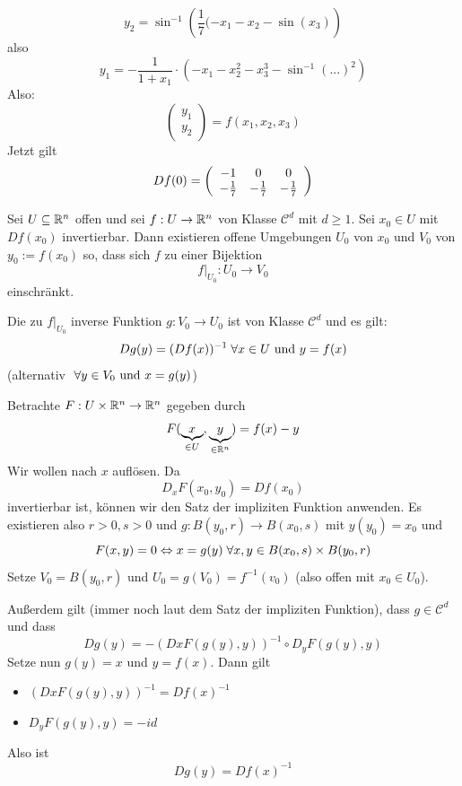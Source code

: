 \documentclass[main.tex]{subfiles}
\begin{document}
\begin{Beispiel}
  $$y_2 = \sin^{-1}\left(\dfrac{1}{7} (-x_1 - x_2 - \sin(x_3)\right)$$
  also
  $$y_1 = - \dfrac{1}{1 + x_1} \cdot (-x_1 - x_2^2 - x_3^3 - \sin^{-1}(...)^2)$$
  Also:
  $$\left(\begin{array}{c}
    y_1 \\ y_2
  \end{array}\right) = f(x_1,x_2,x_3)$$
  Jetzt gilt
  $$Df(0) = \left(\begin{array}{c c c}
    -1 & 0 & 0 \\
    -\frac{1}{7} & -\frac{1}{7} & -\frac{1}{7}
  \end{array}\right)$$
\end{Beispiel}

\begin{Theorem}
  Sei $U \subseteq \mathbb{R}^n$ offen und sei $f: U \to \mathbb{R}^n$ von Klasse $\mathcal{C}^d$ mit $d \geq 1$. Sei $x_0 \in U$ mit $Df(x_0)$ invertierbar. Dann existieren offene Umgebungen $U_0$ von $x_0$ und $V_0$ von $y_0 := f(x_0)$ so, dass sich $f$ zu einer Bijektion
  $$f |_{U_0} : U_0 \to V_0$$
  einschränkt.

  Die zu $f |_{U_0}$ inverse Funktion $g: V_0 \to U_0$ ist von Klasse $\mathcal{C}^d$ und es gilt:
  $$Dg(y) = (Df(x))^{-1} \;\forall x \in U \text{ und } y = f(x)$$
  (alternativ $\;\forall y \in V_0 \text{ und } x =g(y)$)
\end{Theorem}

\begin{Beweis}
  Betrachte $F: U \times \mathbb{R}^n \to \mathbb{R}^n$ gegeben durch
  $$F(\underbrace{x}_{\in U}, \underbrace{y}_{\in \mathbb{R}^n}) = f(x) -y$$
  Wir wollen nach $x$ auflösen. Da
  $$D_x F (x_0,y_0) = Df(x_0)$$
  invertierbar ist, können wir den Satz der impliziten Funktion anwenden. Es existieren also $r > 0, s >0$ und $g: B(y_0,r) \to B(x_0,s)$ mit $y(y_0) = x_0$ und
  $$F(x,y) = 0 \Leftrightarrow x = g(y) \;\forall x,y \in B(x_0,s) \times B(y_0,r)$$
  Setze $V_0 = B(y_0,r)$ und $U_0 = g(V_0) = f^{-1}(v_0)$ (also offen mit $x_0 \in U_0$).

  Außerdem gilt (immer noch laut dem Satz der impliziten Funktion), dass $g \in \mathcal{C}^d$ und dass
  $$Dg(y) = -(Dx F(g(y),y))^{-1} \circ D_y F(g(y),y)$$
  Setze nun $g(y) = x$ und $y = f(x)$. Dann gilt
  \begin{itemize}
    \item $(Dx F(g(y),y))^{-1} = Df(x)^{-1}$
    \item $D_y F(g(y),y) = - id$
  \end{itemize}
  Also ist
  $$Dg(y) = Df(x)^{-1}$$
\end{Beweis}
\end{document}
